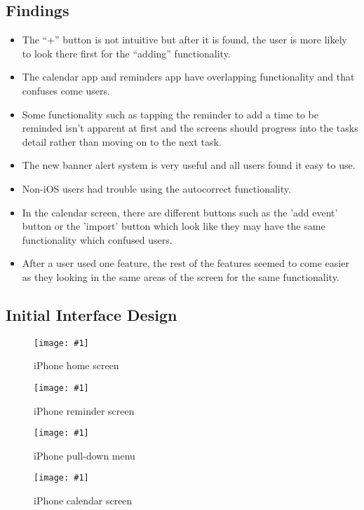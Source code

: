 \subsection{Findings}
\begin{itemize}
    \item The ``+'' button is not intuitive but after it is found, the user is more likely to look there first for the ``adding'' functionality.
    \item The calendar app and reminders app have overlapping functionality and that confuses come users.
    \item Some functionality such as tapping the reminder to add a time to be reminded isn't apparent at first and the screens should progress into the tasks detail rather than moving on to the next task.
    \item The new banner alert system is very useful and all users found it easy to use.
    \item Non-iOS users had trouble using the autocorrect functionality.
    \item In the calendar screen, there are different buttons such as the 'add event' button or the 'import' button which look like they may have the same functionality which confused users.
    \item After a user used one feature, the rest of the features seemed to come easier as they looking in the same areas of the screen for the same functionality. 
\end{itemize}
\subsection{Initial Interface Design}

\newcommand{\mypic}[2]{
\begin{figure}[H]
    \centering
    \texttt{[image: \#1]} 
    \caption{#2}
\end{figure}
}

\mypic{iphone_home.png}{iPhone home screen}
\mypic{iphone_reminder.png}{iPhone reminder screen}
\mypic{iphone_weather.png}{iPhone pull-down menu}
\mypic{iphone_cal.png}{iPhone calendar screen}

